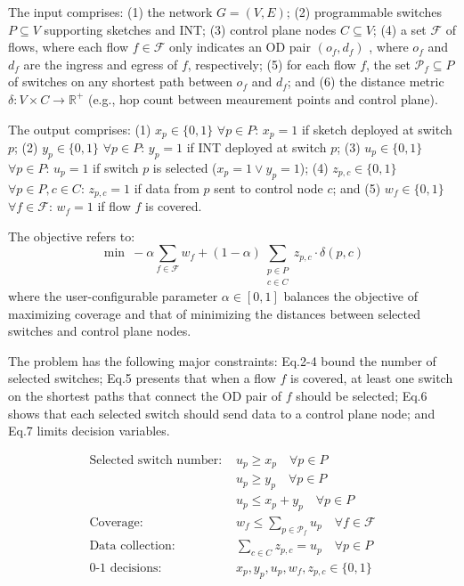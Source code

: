  The input comprises:
(1) the network $G = (V, E)$;
(2) programmable switches $P \subseteq V$ supporting sketches and INT;
(3) control plane nodes $C \subseteq V$;
(4) a set $\mathcal{F}$ of flows, where each flow $f \in \mathcal{F}$ only indicates an OD pair $(o_f, d_f)$ \cite{liu2016one,anup2022hetero}, where $o_f$ and $d_f$ are the ingress and egress of $f$, respectively; 
(5) for each flow $f$, the set $\mathcal{P}_f \subseteq P$ of switches on any shortest path between $o_f$ and $d_f$;
and (6) the distance metric $\delta: V \times C \to \mathbb{R}^+$ (e.g., hop count between meaurement points and control plane).

 The output comprises:
(1) $x_p \in \{0,1\}$ $\forall p \in P$: $x_p=1$ if sketch deployed at switch $p$;
(2) $y_p \in \{0,1\}$ $\forall p \in P$: $y_p=1$ if INT deployed at switch $p$;
(3) $u_p \in \{0,1\}$ $\forall p \in P$: $u_p=1$ if switch $p$ is selected ($x_p =1 \lor y_p=1$);
(4) $z_{p,c} \in \{0,1\}$ $\forall p \in P, c \in C$: $z_{p,c}=1$ if data from $p$ sent to control node $c$;
and (5) $w_f \in \{0,1\}$ $\forall f \in \mathcal{F}$: $w_f=1$ if flow $f$ is covered.

 The objective refers to:
\begin{equation}
\min\ -\alpha \sum_{f \in \mathcal{F}} w_f + (1-\alpha) \sum_{\substack{p \in P \\ c \in C}} z_{p,c} \cdot \delta(p, c)
\label{eq:objective}
\end{equation}
where the user-configurable parameter $\alpha \in [0,1]$ balances the objective of maximizing coverage and that of minimizing the distances between selected switches and control plane nodes. 

 The problem has the following major constraints: Eq.2-4 bound the number of selected switches; Eq.5 presents that when a flow $f$ is covered, at least one switch on the shortest paths that connect the OD pair of $f$ should be selected; Eq.6 shows that each selected switch should send data to a control plane node; and Eq.7 limits decision variables. 

\vspace{-7pt}
{\footnotesize
\begin{align}
\text{Selected switch number: } &u_p \geq x_p \quad \forall p \in P \\
&u_p \geq y_p \quad \forall p \in P \\
&u_p \leq x_p + y_p \quad \forall p \in P \\
\text{Coverage: } &w_f \leq \sum_{p \in \mathcal{P}_f} u_p \quad \forall f \in \mathcal{F} \\
\text{Data collection: } &\sum_{c \in C} z_{p,c} = u_p \quad \forall p \in P \\
\text{0-1 decisions: } &x_p, y_p, u_p, w_f, z_{p,c} \in \{0,1\}
\end{align}}


